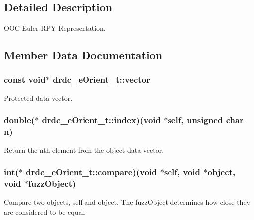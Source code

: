 \subsection{Detailed Description}
OOC Euler RPY Representation. 



\subsection{Member Data Documentation}
\hypertarget{structdrdc__eOrient__t_f2af5b645f5c1ca1629335cf5d9f3e5e}{
\subsubsection[vector]{\setlength{\rightskip}{0pt plus 5cm}const void$\ast$ {\bf drdc\_\-eOrient\_\-t::vector}}}
\label{structdrdc__eOrient__t_f2af5b645f5c1ca1629335cf5d9f3e5e}


Protected data vector. 

\hypertarget{structdrdc__eOrient__t_d59e483e9439f6fdfa6815f55fb5ee98}{
\subsubsection[index]{\setlength{\rightskip}{0pt plus 5cm}double($\ast$ {\bf drdc\_\-eOrient\_\-t::index})(void $\ast$self, unsigned char n)}}
\label{structdrdc__eOrient__t_d59e483e9439f6fdfa6815f55fb5ee98}


Return the nth element from the object data vector. 

\hypertarget{structdrdc__eOrient__t_43134125625a557e14154ecf72520924}{
\subsubsection[compare]{\setlength{\rightskip}{0pt plus 5cm}int($\ast$ {\bf drdc\_\-eOrient\_\-t::compare})(void $\ast$self, void $\ast$object, void $\ast$fuzzObject)}}
\label{structdrdc__eOrient__t_43134125625a557e14154ecf72520924}


Compare two objects, self and object. The fuzzObject determines how close they are considered to be equal. 

